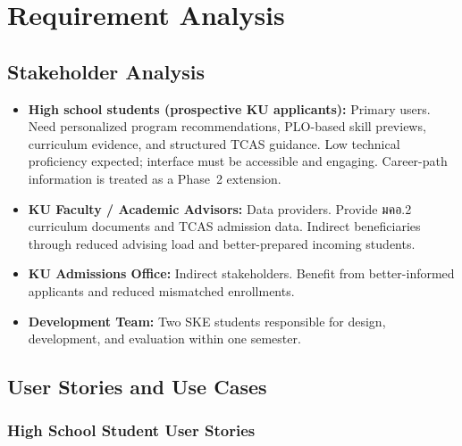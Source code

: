 \chapter{Requirement Analysis}
\label{chap:requirement-analysis}

\section{Stakeholder Analysis}
\label{section:stakeholder-analysis}

\begin{itemize}[leftmargin=80pt]
    \item \textbf{High school students (prospective KU applicants):} Primary users. Need personalized program recommendations, PLO-based skill previews, curriculum evidence, and structured TCAS guidance. Low technical proficiency expected; interface must be accessible and engaging. Career-path information is treated as a Phase~2 extension.

    \item \textbf{KU Faculty / Academic Advisors:} Data providers. Provide มคอ.2 curriculum documents and TCAS admission data. Indirect beneficiaries through reduced advising load and better-prepared incoming students.

    \item \textbf{KU Admissions Office:} Indirect stakeholders. Benefit from better-informed applicants and reduced mismatched enrollments.

    \item \textbf{Development Team:} Two SKE students responsible for design, development, and evaluation within one semester.
\end{itemize}

\section{User Stories and Use Cases}
\label{section:user-stories-use-cases}

\subsection{High School Student User Stories}
\label{subsection:hs-student-user-stories}

